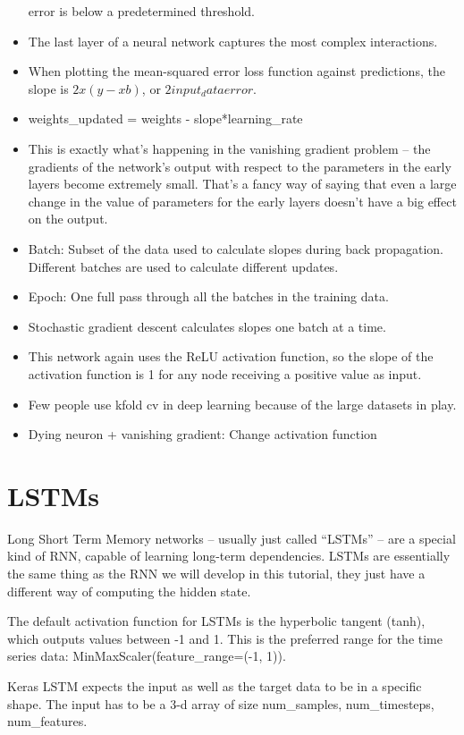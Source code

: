 \documentclass[]{book}
\begin{document}
\begin{itemize}
  error is below a predetermined threshold.
\item
  The last layer of a neural network captures the most complex
  interactions.
\item
  When plotting the mean-squared error loss function against
  predictions, the slope is \(2x(y-xb)\), or \(2input_data error\).
\item
  weights\_updated = weights - slope*learning\_rate
\item
  This is exactly what's happening in the vanishing gradient problem --
  the gradients of the network's output with respect to the parameters
  in the early layers become extremely small. That's a fancy way of
  saying that even a large change in the value of parameters for the
  early layers doesn't have a big effect on the output.
\item
  Batch: Subset of the data used to calculate slopes during back
  propagation. Different batches are used to calculate different
  updates.
\item
  Epoch: One full pass through all the batches in the training data.
\item
  Stochastic gradient descent calculates slopes one batch at a time.
\item
  This network again uses the ReLU activation function, so the slope of
  the activation function is 1 for any node receiving a positive value
  as input.
\item
  Few people use kfold cv in deep learning because of the large datasets
  in play.
\item
  Dying neuron + vanishing gradient: Change activation function
\end{itemize}

\section{LSTMs}\label{lstms}

Long Short Term Memory networks -- usually just called ``LSTMs'' -- are
a special kind of RNN, capable of learning long-term dependencies. LSTMs
are essentially the same thing as the RNN we will develop in this
tutorial, they just have a different way of computing the hidden state.

The default activation function for LSTMs is the hyperbolic tangent
(tanh), which outputs values between -1 and 1. This is the preferred
range for the time series data: MinMaxScaler(feature\_range=(-1, 1)).

Keras LSTM expects the input as well as the target data to be in a
specific shape. The input has to be a 3-d array of size num\_samples,
num\_timesteps, num\_features.
\end{document}
